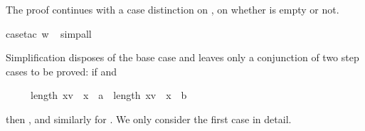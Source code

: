 \begin{isabellebody}
\begin{isamarkuptxt}
The proof continues with a case distinction on ,
on whether  is empty or not.%
\end{isamarkuptxt}%
\isamarkuptrue%
case{\isacharunderscore}tac\ w{\isacharparenright}\isanewline
\ \isamarkupfalse%
simp{\isacharunderscore}all{\isacharparenright}\isamarkupfalse%
\isamarkupfalse%
%
\begin{isamarkuptxt}%
\noindent
Simplification disposes of the base case and leaves only a conjunction
of two step cases to be proved:
if  and \begin{isabelle}%
\ \ \ \ \ length\ {\isacharbrackleft}x{\isasymin}v\ {\isachardot}\ x\ {\isacharequal}\ a{\isacharbrackright}\ {\isacharequal}\ length\ {\isacharbrackleft}x{\isasymin}v\ {\isachardot}\ x\ {\isacharequal}\ b{\isacharbrackright}\ {\isacharplus}\ {}%
\end{isabelle} then
, and similarly for .
We only consider the first case in detail.


\end{isamarkuptxt}
\end{isabellebody}
